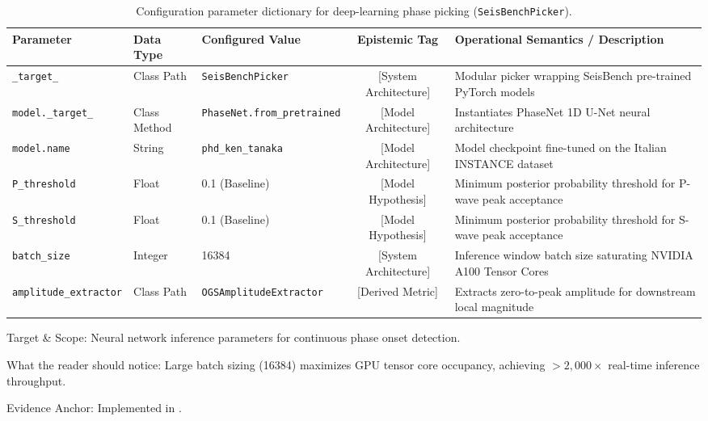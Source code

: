 \begin{landscape}
  \begin{table}[htbp]
    \centering
    \small
    \caption{Configuration parameter dictionary for deep-learning
    phase picking (\texttt{SeisBenchPicker}).}
    \label{tab:app_picker_dictionary}
    \begin{threeparttable}
      \begin{tabularx}{\linewidth}{l l l c >{\raggedright\arraybackslash}X}
        \toprule
        \textbf{Parameter} & \textbf{Data Type} & \textbf{Configured
        Value} & \textbf{Epistemic Tag} & \textbf{Operational
        Semantics / Description} \\
        \midrule
        \texttt{\_target\_} & Class Path & \texttt{SeisBenchPicker} &
        [System Architecture] & Modular picker wrapping SeisBench
        pre-trained PyTorch models \\
        \texttt{model.\_target\_} & Class Method &
        \texttt{PhaseNet.from\_pretrained} & [Model Architecture] &
        Instantiates \ac{PhaseNet} 1D U-Net neural architecture \\
        \texttt{model.name} & String & \texttt{phd\_ken\_tanaka} &
        [Model Architecture] & Model checkpoint fine-tuned on the
        Italian \ac{INSTANCE} dataset \\
        \texttt{P\_threshold} & Float & \num{0.1} (Baseline) & [Model
        Hypothesis] & Minimum posterior probability threshold for
        P-wave peak acceptance \\
        \texttt{S\_threshold} & Float & \num{0.1} (Baseline) & [Model
        Hypothesis] & Minimum posterior probability threshold for
        S-wave peak acceptance \\
        \texttt{batch\_size} & Integer & \num{16384} & [System
        Architecture] & Inference window batch size saturating NVIDIA
        A100 Tensor Cores \\
        \texttt{amplitude\_extractor} & Class Path &
        \texttt{OGSAmplitudeExtractor} & [Derived Metric] & Extracts
        zero-to-peak amplitude for downstream local magnitude \\
        \bottomrule
      \end{tabularx}
      \begin{tablenotes}[flushleft]
        \footnotesize
      \item Target \& Scope: Neural network inference parameters for
        continuous phase onset detection.
      \item What the reader should notice: Large batch sizing
        (\num{16384}) maximizes \ac{GPU} tensor core occupancy, achieving
        $>2{,}000 \times$ real-time inference throughput.
      \item Evidence Anchor: Implemented in .
      \end{tablenotes}
    \end{threeparttable}
  \end{table}
\end{landscape}

